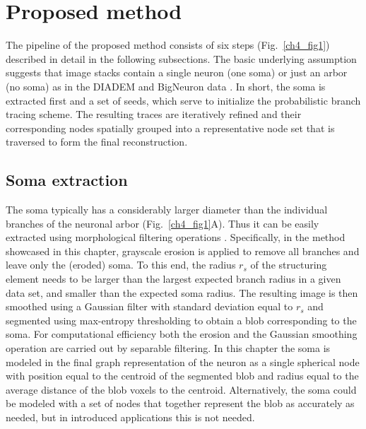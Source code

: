 \section{Proposed method}
\label{sec:method}

The pipeline of the proposed method consists of six steps (Fig.~\ref{ch4_fig1}) described in detail in the following subsections. The basic underlying assumption suggests that image stacks contain a single neuron (one soma) or just an arbor (no soma) as in the DIADEM \cite{brown2011diadem} and BigNeuron data \cite{peng2015bigneuron}. In short, the soma is extracted first and a set of seeds, which serve to initialize the probabilistic branch tracing scheme. The resulting traces are iteratively refined and their corresponding nodes spatially grouped into a representative node set that is traversed to form the final reconstruction.

\subsection{Soma extraction}
\label{subsec:soma-extraction}
The soma typically has a considerably larger diameter than the individual branches of the neuronal arbor (Fig.~\ref{ch4_fig1}A). Thus it can be easily extracted using morphological filtering operations \cite{yan2013automated}. Specifically, in the method showcased in this chapter, grayscale erosion is applied to remove all branches and leave only the (eroded) soma. To this end, the radius $r_s$ of the structuring element needs to be larger than the largest expected branch radius in a given data set, and smaller than the expected soma radius. The resulting image is then smoothed using a Gaussian filter with standard deviation equal to $r_s$ and segmented using max-entropy thresholding \cite{radojevic2016fuzzy} to obtain a blob corresponding to the soma. For computational efficiency both the erosion and the Gaussian smoothing operation are carried out by separable filtering. In this chapter the soma is modeled in the final graph representation of the neuron as a single spherical node with position equal to the centroid of the segmented blob and radius equal to the average distance of the blob voxels to the centroid. Alternatively, the soma could be modeled with a set of nodes that together represent the blob as accurately as needed, but in introduced applications this is not needed.

